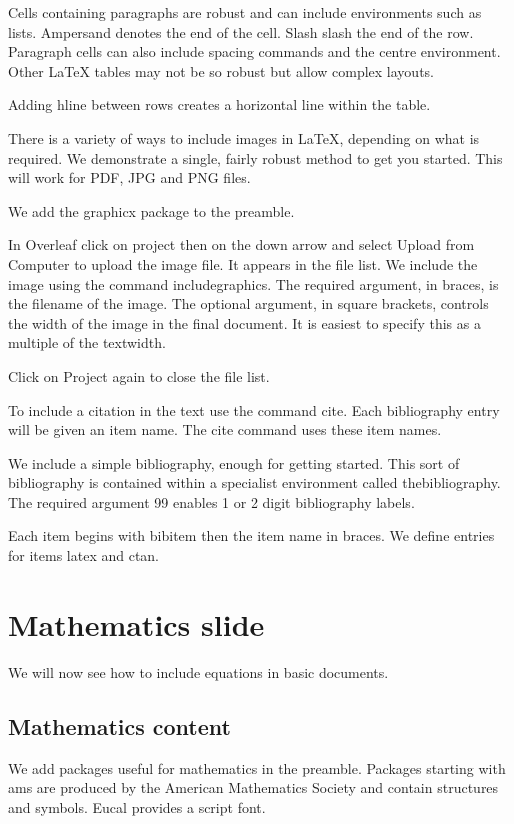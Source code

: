 \documentclass[a4paper,14pt]{extarticle}
\begin{document}
Cells containing paragraphs are robust and can include environments such as lists. Ampersand denotes the end of the cell. Slash slash the end of the row. Paragraph cells can also include spacing commands and the centre environment. Other LaTeX tables may not be so robust but allow complex layouts. 

Adding hline between rows creates a horizontal line within the table. 

There is a variety of ways to include images in LaTeX, depending on what is required. We demonstrate a single, fairly robust method to get you started. This will work for PDF, JPG and PNG files. 

We add the graphicx package to the preamble. 

In Overleaf click on project then on the down arrow and select Upload from Computer to upload the image file. It appears in the file list. We include the image using the command includegraphics. The required argument, in braces, is the filename of the image. The optional argument, in square brackets, controls the width of the image in the final document. It is easiest to specify this as a multiple of the textwidth. 

Click on Project again to close the file list. 

To include a citation in the text use the command cite. Each bibliography entry will be given an item name. The cite command uses these item names.

We include a simple bibliography, enough for getting started. This sort of bibliography is contained within a specialist environment called thebibliography. The required argument 99 enables 1 or 2 digit bibliography labels.

Each item begins with bibitem then the item name in braces. We define entries for items latex and ctan. 

\section{Mathematics slide}

We will now see how to include equations in basic documents. 

\subsection{Mathematics content}

We add packages useful for mathematics in the preamble. Packages starting with ams are produced by the American Mathematics Society and contain structures and symbols. Eucal provides a script font. 
\end{document}
